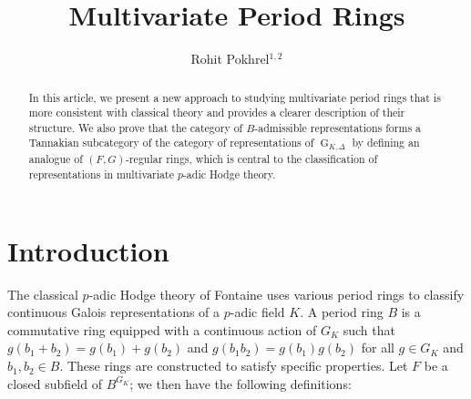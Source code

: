 \documentclass{amsart}
\DeclareMathOperator{\G}{G}
\begin{document}
\title{Multivariate Period Rings}

\author{Rohit Pokhrel$^{1,2}$}
\address{$^1$Harish-Chandra Research Institute, Chhatnag Road, Jhunsi, Prayagraj, Uttar Pradesh, India}
\address{$^2$Homi Bhabha National Institute, Training School Complex, Anushakti Nagar, Mumbai 400094, India}


\begin{abstract}
    In this article, we present a new approach to studying multivariate period rings that is more consistent with classical theory and provides a clearer description of their structure. We also prove that the category of $B$-admissible representations forms a Tannakian subcategory of the category of representations of $\G_{K,\Delta}$ by defining an analogue of $(F,G)$-regular rings, which is central to the classification of representations in multivariate $p$-adic Hodge theory.
\end{abstract}

\maketitle

\section{Introduction}

The classical $p$-adic Hodge theory of Fontaine uses various period rings to classify continuous Galois representations of a $p$-adic field $K$. A period ring $B$ is a commutative ring equipped with a continuous action of $G_K$ such that $g(b_1+b_2)=g(b_1)+g(b_2)$ and $g(b_1b_2)=g(b_1)g(b_2)$ for all $g\in G_K$ and $b_1,b_2\in B$. These rings are constructed to satisfy specific properties. Let $F$ be a closed subfield of $B^{G_K}$; we then have the following definitions:
\end{document}
